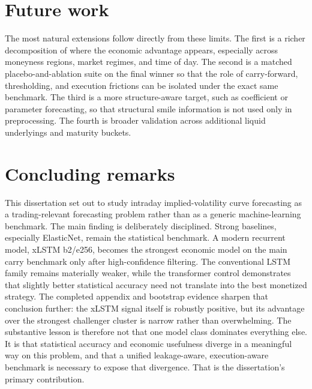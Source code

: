 \documentclass[12pt]{report}
\begin{document}
\section{Future work}
The most natural extensions follow directly from these limits. The first is a richer decomposition of where the economic advantage appears, especially across moneyness regions, market regimes, and time of day. The second is a matched placebo-and-ablation suite on the final winner so that the role of carry-forward, thresholding, and execution frictions can be isolated under the exact same benchmark. The third is a more structure-aware target, such as coefficient or parameter forecasting, so that structural smile information is not used only in preprocessing. The fourth is broader validation across additional liquid underlyings and maturity buckets.

\section*{Concluding remarks}
This dissertation set out to study intraday implied-volatility curve forecasting as a trading-relevant forecasting problem rather than as a generic machine-learning benchmark. The main finding is deliberately disciplined. Strong baselines, especially ElasticNet, remain the statistical benchmark. A modern recurrent model, xLSTM b2/e256, becomes the strongest economic model on the main carry benchmark only after high-confidence filtering. The conventional LSTM family remains materially weaker, while the transformer control demonstrates that slightly better statistical accuracy need not translate into the best monetized strategy. The completed appendix and bootstrap evidence sharpen that conclusion further: the xLSTM signal itself is robustly positive, but its advantage over the strongest challenger cluster is narrow rather than overwhelming. The substantive lesson is therefore not that one model class dominates everything else. It is that statistical accuracy and economic usefulness diverge in a meaningful way on this problem, and that a unified leakage-aware, execution-aware benchmark is necessary to expose that divergence. That is the dissertation's primary contribution.
\end{document}

